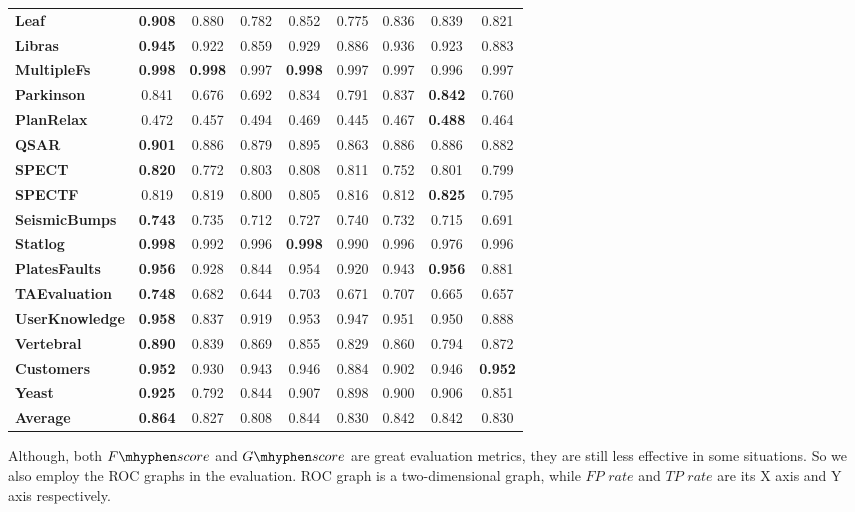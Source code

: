 \documentclass{iitthesis}
\newcommand\fscore{\mathop{F\mhyphen score}}
\newcommand\gscore{\mathop{G\mhyphen score}}
\begin{document}
\begin{table}[t]
\begin{center}
{\begin{tabular}{lcccccccc}
\textbf{Leaf} & \textbf{0.908} & 0.880 & 0.782 & 0.852 & 0.775 & 0.836 & 0.839 & 0.821 \\ 
\textbf{Libras} & \textbf{0.945} & 0.922 & 0.859 & 0.929 & 0.886 & 0.936 & 0.923 & 0.883 \\ 
\textbf{MultipleFs} & \textbf{0.998} & \textbf{0.998} & 0.997 & \textbf{0.998} & 0.997 & 0.997 & 0.996 & 0.997 \\ 
\textbf{Parkinson} & 0.841 & 0.676 & 0.692 & 0.834 & 0.791 & 0.837 & \textbf{0.842} & 0.760 \\ 
\textbf{PlanRelax} & 0.472 & 0.457 & 0.494 & 0.469 & 0.445 & 0.467 & \textbf{0.488} & 0.464 \\ 
\textbf{QSAR} & \textbf{0.901} & 0.886 & 0.879 & 0.895 & 0.863 & 0.886 & 0.886 & 0.882 \\ 
\textbf{SPECT} & \textbf{0.820} & 0.772 & 0.803 & 0.808 & 0.811 & 0.752 & 0.801 & 0.799 \\ 
\textbf{SPECTF} & 0.819 & 0.819 & 0.800 & 0.805 & 0.816 & 0.812 & \textbf{0.825} & 0.795 \\ 
\textbf{SeismicBumps} & \textbf{0.743} & 0.735 & 0.712 & 0.727 & 0.740 & 0.732 & 0.715 & 0.691 \\ 
\textbf{Statlog} & \textbf{0.998} & 0.992 & 0.996 & \textbf{0.998} & 0.990 & 0.996 & 0.976 & 0.996 \\ 
\textbf{PlatesFaults} & \textbf{0.956} & 0.928 & 0.844 & 0.954 & 0.920 & 0.943 & \textbf{0.956} & 0.881 \\ 
\textbf{TAEvaluation} & \textbf{0.748} & 0.682 & 0.644 & 0.703 & 0.671 & 0.707 & 0.665 & 0.657 \\ 
\textbf{UserKnowledge} & \textbf{0.958} & 0.837 & 0.919 & 0.953 & 0.947 & 0.951 & 0.950 & 0.888 \\ 
\textbf{Vertebral} & \textbf{0.890} & 0.839 & 0.869 & 0.855 & 0.829 & 0.860 & 0.794 & 0.872 \\ 
\textbf{Customers} & \textbf{0.952} & 0.930 & 0.943 & 0.946 & 0.884 & 0.902 & 0.946 & \textbf{0.952} \\ 
\textbf{Yeast} & \textbf{0.925} & 0.792 & 0.844 & 0.907 & 0.898 & 0.900 & 0.906 & 0.851 \\
\textbf{Average} & \textbf{0.864} & 0.827 & 0.808 & 0.844 & 0.830 & 0.842 & 0.842 & 0.830 \\
\hline
\end{tabular}
}
\end{center}
\label{tab: results_real_data_per_file}
\end{table} 

Although, both $\fscore$ and $\gscore$ are great evaluation metrics, they are still less effective in some situations. So we also employ the ROC graphs \cite{fawcett2004roc}\cite{mohri2005confidence} in the evaluation. ROC graph is a two-dimensional graph, while $FP$ $rate$ and $TP$ $rate$ are its X axis and Y axis respectively. 
\end{document}
